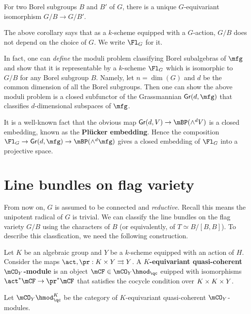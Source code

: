 	\begin{cor}
		For two Borel subgroups $B$ and $B'$ of $G$, there is a unique $G$-equivariant isomorphism $G/B \to G/B'$.
	\end{cor}

	\begin{notn}
		The above corollary says that as a $k$-scheme equipped with a $G$-action, $G/B$ does not depend on the choice of $G$. We write $\Fl_G$ for it.
	\end{notn}


	\begin{rem}
		In fact, one can \emph{define} the moduli problem classifying Borel subalgebras of $\mfg$ and show that it is representable by a $k$-scheme $\Fl_G$ which is isomorphic to $G/B$ for any Borel subgroup $B$. Namely, let $n=\dim(G)$ and $d$ be the common dimension of all the Borel subgroups. Then one can show the above moduli problem is a closed subfunctor of the Grassmannian $\mathsf{Gr}(d,\mfg)$ that classifies $d$-dimensional subspaces of $\mfg$. 

		It is a well-known fact that the obvious map $\mathsf{Gr}(d,V) \to \mBP(\wedge^d V)$ is a closed embedding, known as the \textbf{Plücker embedding}. Hence the composition $\Fl_G \to \mathsf{Gr}(d,\mfg) \to \mBP(\wedge^d \mfg)$ gives a closed embedding of $\Fl_G$ into a projective space.
	\end{rem}



\section{Line bundles on flag variety}

	From now on, $G$ is assumed to be connected and \emph{reductive}. Recall this means the unipotent radical of $G$ is trivial. We can classify the line bundles on the flag variety $G/B$ using the characters of $B$ (or equivalently, of $T\simeq B/[B,B]$). To describe this classfication, we need the following construction.

	\begin{defn}
		Let $K$ be an algebraic group and $Y$ be a $k$-scheme equipped with an action of $H$. Consider the maps $\act,\pr: K \mt Y \rightrightarrows Y$. A \textbf{$K$-equivariant quasi-coherent $\mCO_Y$-module} is an object $\mCF \in \mCO_Y \hmod_\qc$ euipped with isomorphisms $\act^*\mCF \to \pr^*\mCF$ that satisfies the cocycle condition over $K\mt K\mt Y$.

		Let $\mCO_Y \hmod_\qc^K$ be the category of $K$-equivariant quasi-coherent $\mCO_Y$-modules.
	\end{defn}

